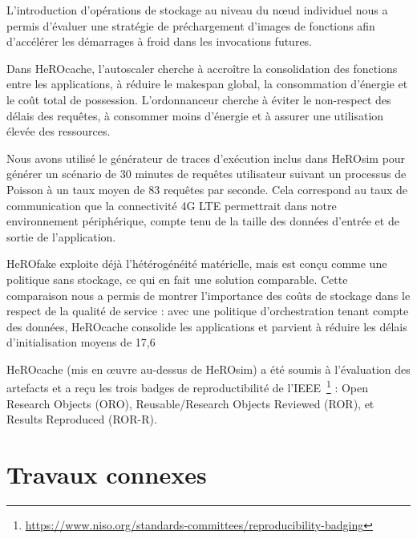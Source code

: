 L'introduction d'opérations de stockage au niveau du nœud individuel nous a permis d'évaluer une stratégie de préchargement d'images de fonctions afin d'accélérer les démarrages à froid dans les invocations futures.

Dans HeROcache, l'autoscaler cherche à accroître la consolidation des fonctions entre les applications, à réduire le makespan global, la consommation d'énergie et le coût total de possession. L'ordonnanceur cherche à éviter le non-respect des délais des requêtes, à consommer moins d'énergie et à assurer une utilisation élevée des ressources.

Nous avons utilisé le générateur de traces d'exécution inclus dans HeROsim pour générer un scénario de 30 minutes de requêtes utilisateur suivant un processus de Poisson à un taux moyen de 83 requêtes par seconde. Cela correspond au taux de communication que la connectivité 4G LTE permettrait dans notre environnement périphérique, compte tenu de la taille des données d'entrée et de sortie de l'application. 

HeROfake exploite déjà l'hétérogénéité matérielle, mais est conçu comme une politique sans stockage, ce qui en fait une solution comparable. Cette comparaison nous a permis de montrer l'importance des coûts de stockage dans le respect de la qualité de service : avec une politique d'orchestration tenant compte des données, HeROcache consolide les applications et parvient à réduire les délais d'initialisation moyens de 17,6 %

HeROcache (mis en œuvre au-dessus de HeROsim) a été soumis à l'évaluation des artefacts et a reçu les trois badges de reproductibilité de l'IEEE~\footnote{\href{https://www.niso.org/standards-committees/reproducibility-badging}{https://www.niso.org/standards-committees/reproducibility-badging}} : Open Research Objects (ORO), Reusable/Research Objects Reviewed (ROR), et Results Reproduced (ROR-R).

\section{Travaux connexes}
\label{section:herosim-sota}

